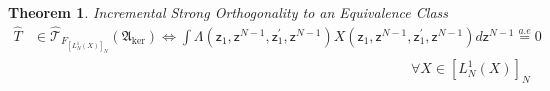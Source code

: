 \documentclass[aps,preprint]{revtex4}%
\newtheorem{theorem}{Theorem}
\begin{document}
\begin{theorem}
Incremental Strong Orthogonality to an Equivalence Class
\begin{align}
\hat{T}  &  \in\mathcal{\hat{T}}_{F_{\left[  L_{N}^{1}\left(  X\right)
\right]  _{N}}}\left(  \mathfrak{A}_{\ker}\right)  \Leftrightarrow%
{\displaystyle\int}
\Lambda\left(  \mathsf{z}_{1},\mathsf{z}^{N-1},\mathsf{z}_{1}^{\prime
},\mathsf{z}^{N-1}\right)  X\left(  \mathsf{z}_{1},\mathsf{z}^{N-1}%
,\mathsf{z}_{1}^{\prime},\mathsf{z}^{N-1}\right)  d\mathsf{z}^{N-1}%
\overset{a.e}{=}0\nonumber\\
&  \quad\qquad\qquad\qquad\qquad\qquad\qquad\qquad\qquad\qquad\qquad
\qquad\qquad\qquad\forall X\in\left[  L_{N}^{1}\left(  X\right)  \right]  _{N}%
\end{align}

\end{theorem}
\end{document}
